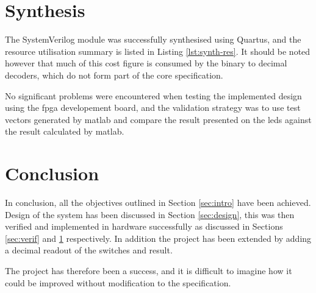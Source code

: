 \FloatBarrier
\section{Synthesis}  \label{sec:synth}
The SystemVerilog module was successfully synthesised using Quartus, and the resource utilisation summary is listed in Listing \ref{lst:synth-res}. It should be noted however that much of this cost figure is consumed by the binary to decimal decoders, which do not form part of the core specification.



No significant problems were encountered when testing the implemented design using the \gls{fpga} developement board, and the validation strategy was to use test vectors generated by \gls{matlab} and compare the result presented on the \glspl{led} against the result calculated by \gls{matlab}.

\FloatBarrier
\section{Conclusion}  \label{sec:conclusion}
In conclusion, all the objectives outlined in Section \ref{sec:intro} have been achieved. Design of the system has been discussed in Section \ref{sec:design}, this was then verified and implemented in hardware successfully as discussed in Sections \ref{sec:verif} and \ref{sec:synth} respectively. In addition the project has been extended by adding a decimal readout of the switches and result.

The project has therefore been a success, and it is difficult to imagine how it could be improved without modification to the specification.

